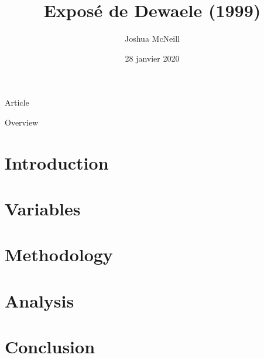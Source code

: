 \documentclass{beamer}
\author{Joshua McNeill}
\date{28 janvier 2020}
\title{Exposé de Dewaele (1999)}
\begin{document}
  \begin{frame}
    \titlepage
  \end{frame}

  \begin{frame}{Article}
  \end{frame}

  \begin{frame}{Overview}
    \tableofcontents
  \end{frame}


  \section{Introduction}
  \section{Variables}
  \section{Methodology}
  \section{Analysis}
  \section{Conclusion}
\end{document}
